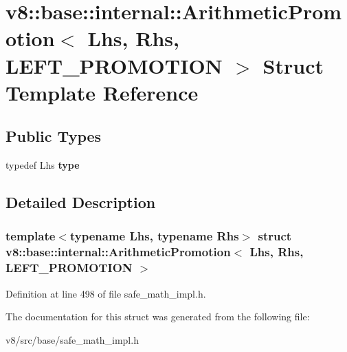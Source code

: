 \hypertarget{structv8_1_1base_1_1internal_1_1ArithmeticPromotion_3_01Lhs_00_01Rhs_00_01LEFT__PROMOTION_01_4}{}\section{v8\+:\+:base\+:\+:internal\+:\+:Arithmetic\+Promotion$<$ Lhs, Rhs, L\+E\+F\+T\+\_\+\+P\+R\+O\+M\+O\+T\+I\+ON $>$ Struct Template Reference}
\label{structv8_1_1base_1_1internal_1_1ArithmeticPromotion_3_01Lhs_00_01Rhs_00_01LEFT__PROMOTION_01_4}
\subsection*{Public Types}
\begin{DoxyCompactItemize}
\item 
\mbox{\label{structv8_1_1base_1_1internal_1_1ArithmeticPromotion_3_01Lhs_00_01Rhs_00_01LEFT__PROMOTION_01_4_a45b66410f428ca9f1a9b4ae9fe31957c}} 
typedef Lhs {\bfseries type}
\end{DoxyCompactItemize}


\subsection{Detailed Description}
\subsubsection*{template$<$typename Lhs, typename Rhs$>$\newline
struct v8\+::base\+::internal\+::\+Arithmetic\+Promotion$<$ Lhs, Rhs, L\+E\+F\+T\+\_\+\+P\+R\+O\+M\+O\+T\+I\+O\+N $>$}



Definition at line 498 of file safe\+\_\+math\+\_\+impl.\+h.



The documentation for this struct was generated from the following file\+:\begin{DoxyCompactItemize}
\item 
v8/src/base/safe\+\_\+math\+\_\+impl.\+h\end{DoxyCompactItemize}
